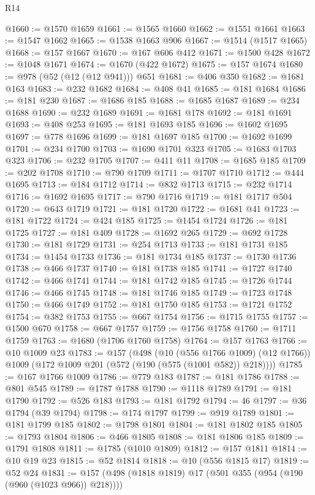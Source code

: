 \begin{lexlean}{R14}
\begin{coremodule}
@1660 := @1570 @1659
@1661 := @1565 @1660
@1662 := @1551 @1661
@1663 := @1547 @1662
@1665 := @1538 @1663 @906
@1667 := @1514 (@1517 @1665)
@1668 := @157 @1667
@1670 := @167 @606 @412
@1671 := @1500 @428
@1672 := @1048 @1671
@1674 := @1670 (@422 @1672)
@1675 := @157 @1674
@1680 := @978 (@52 (@12 (@12 @941))) @651
@1681 := @406 @350
@1682 := @1681 @163
@1683 := @232 @1682
@1684 := @408 @41
@1685 := @181 @1684
@1686 := @181 @230
@1687 := @1686 @185
@1688 := @1685 @1687
@1689 := @234 @1688
@1690 := @232 @1689
@1691 := @1681 @178
@1692 := @181 @1691
@1693 := @408 @253
@1695 := @181 @1693 @185
@1696 := @1602 @1695
@1697 := @778 @1696
@1699 := @181 @1697 @185
@1700 := @1692 @1699
@1701 := @234 @1700
@1703 := @1690 @1701 @323
@1705 := @1683 @1703 @323
@1706 := @232 @1705
@1707 := @411 @11
@1708 := @1685 @185
@1709 := @202 @1708
@1710 := @790 @1709
@1711 := @1707 @1710
@1712 := @444 @1695
@1713 := @184 @1712
@1714 := @832 @1713
@1715 := @232 @1714
@1716 := @1692 @1695
@1717 := @790 @1716
@1719 := @181 @1717 @504
@1720 := @643 @1719
@1721 := @181 @1720
@1722 := @1681 @41
@1723 := @181 @1722
@1724 := @424 @185
@1725 := @1454 @1724
@1726 := @181 @1725
@1727 := @181 @409
@1728 := @1692 @265
@1729 := @692 @1728
@1730 := @181 @1729
@1731 := @254 @1713
@1733 := @181 @1731 @185
@1734 := @1454 @1733
@1736 := @181 @1734 @185
@1737 := @1730 @1736
@1738 := @466 @1737
@1740 := @181 @1738 @185
@1741 := @1727 @1740
@1742 := @466 @1741
@1744 := @181 @1742 @185
@1745 := @1726 @1744
@1746 := @466 @1745
@1748 := @181 @1746 @185
@1749 := @1723 @1748
@1750 := @466 @1749
@1752 := @181 @1750 @185
@1753 := @1721 @1752
@1754 := @382 @1753
@1755 := @667 @1754
@1756 := @1715 @1755
@1757 := @1500 @670
@1758 := @667 @1757
@1759 := @1756 @1758
@1760 := @1711 @1759
@1763 := @1680 (@1706 @1760 @1758)
@1764 := @157 @1763
@1766 := @10 @1009 @23
@1783 := @157
    (@498
      (@10 (@556 @1766 @1009) (@12 @1766))
      @1009
      (@172 @1009 @201 (@572 (@190 (@575 (@1001 @582)) @218))))
@1785 := @167 @1766 @1009
@1786 := @779 @183
@1787 := @181 @1786
@1788 := @801 @545
@1789 := @1787 @1788
@1790 := @1118 @1789
@1791 := @181 @1790
@1792 := @526 @183
@1793 := @181 @1792
@1794 := 46
@1797 := @36 @1794 (@39 @1794)
@1798 := @174 @1797
@1799 := @919 @1789
@1801 := @181 @1799 @185
@1802 := @1798 @1801
@1804 := @181 @1802 @185
@1805 := @1793 @1804
@1806 := @466 @1805
@1808 := @181 @1806 @185
@1809 := @1791 @1808
@1811 := @1785 (@1010 @1809)
@1812 := @157 @1811
@1814 := @10 @19 @23
@1815 := @52 @1814
@1818 := @10 (@556 @1815 @17)
@1819 := @52 @24
@1831 := @157 (@498 (@1818 @1819) @17 (@501 @355 (@954 (@190 (@960 (@1023 @966)) @218))))

\end{coremodule}
\end{lexlean}
